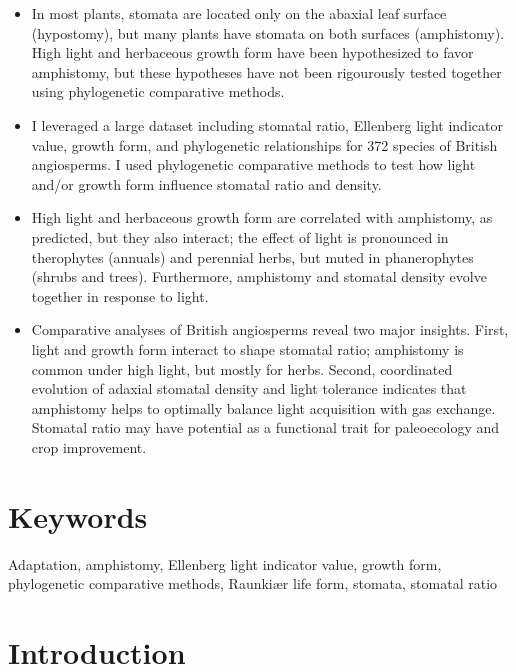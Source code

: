 \documentclass[12pt, oneside]{article}
\begin{document}
\begin{itemize}

	\item In most plants, stomata are located only on the abaxial leaf surface (hypostomy), but many plants have stomata on both surfaces (amphistomy). High light and herbaceous growth form have been hypothesized to favor amphistomy, but these hypotheses have not been rigourously tested together using phylogenetic comparative methods.
	
	\item I leveraged a large dataset including stomatal ratio, Ellenberg light indicator value, growth form, and phylogenetic relationships for 372 species of British angiosperms. I used phylogenetic comparative methods to test how light and/or growth form influence stomatal ratio and density.
	
	\item High light and herbaceous growth form are correlated with amphistomy, as predicted, but they also interact; the effect of light is pronounced in therophytes (annuals) and perennial herbs, but muted in phanerophytes (shrubs and trees). Furthermore, amphistomy and stomatal density evolve together in response to light.
	
	\item Comparative analyses of British angiosperms reveal two major insights. First, light and growth form interact to shape stomatal ratio; amphistomy is common under high light, but mostly for herbs. Second, coordinated evolution of adaxial stomatal density and light tolerance indicates that amphistomy helps to optimally balance light acquisition with gas exchange. Stomatal ratio may have potential as a functional trait for paleoecology and crop improvement.
	
\end{itemize}

\section*{Keywords}

Adaptation, amphistomy, Ellenberg light indicator value, growth form, phylogenetic comparative methods, Raunki\ae r life form, stomata, stomatal ratio

\section*{Introduction}
\end{document}
